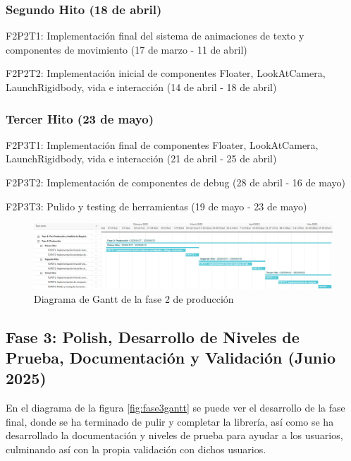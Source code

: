 \subsubsection{Segundo Hito (18 de abril)}

\begin{compactitem}
\item F2P2T1: Implementación final del sistema de animaciones de texto y componentes de movimiento (17 de marzo - 11 de abril)
\item F2P2T2: Implementación inicial de componentes Floater, LookAtCamera, LaunchRigidbody, vida e interacción (14 de abril - 18 de abril)
\end{compactitem}

\subsubsection{Tercer Hito (23 de mayo)}

\begin{compactitem}
\item F2P3T1: Implementación final de componentes Floater, LookAtCamera, LaunchRigidbody, vida e interacción (21 de abril - 25 de abril)
\item F2P3T2: Implementación de componentes de debug (28 de abril - 16 de mayo)
\item F2P3T3: Pulido y testing de herramientas (19 de mayo - 23 de mayo)
\end{compactitem}

\begin{figure}[H]
  \centering
	\includegraphics[width=450px,clip=true]{gant2.png}
  \caption{Diagrama de Gantt de la fase 2 de producción}
  \label{fig:fase2gantt}
\end{figure}

\subsection{Fase 3: Polish, Desarrollo de Niveles de Prueba, Documentación y Validación (Junio 2025)}

En el diagrama de la figura \ref{fig:fase3gantt} se puede ver el desarrollo de la fase final, donde se ha terminado de pulir y completar la librería, 
así como se ha desarrollado la documentación y niveles de prueba para ayudar a los usuarios, culminando así con la propia validación con dichos usuarios.

